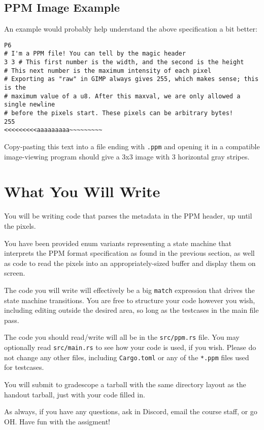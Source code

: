 \documentclass{article}
\begin{document}
\subsection*{PPM Image Example}
An example would probably help understand the above specification a bit better:
\begin{verbatim}
P6
# I'm a PPM file! You can tell by the magic header
3 3 # This first number is the width, and the second is the height
# This next number is the maximum intensity of each pixel
# Exporting as "raw" in GIMP always gives 255, which makes sense; this is the
# maximum value of a u8. After this maxval, we are only allowed a single newline
# before the pixels start. These pixels can be arbitrary bytes!
255
<<<<<<<<<aaaaaaaaa~~~~~~~~~
\end{verbatim}
Copy-pasting this text into a file ending with \texttt{.ppm} and opening it in a compatible image-viewing program should give a 3x3 image with 3 horizontal gray stripes.

\section*{What You Will Write}
You will be writing code that parses the metadata in the PPM header, up until the pixels.

You have been provided enum variants representing a state machine that interprets the PPM format specification as found in the previous section, as well as code to read the pixels into an appropriately-sized buffer and display them on screen.

The code you will write will effectively be a big \texttt{match} expression that drives the state machine transitions. You are free to structure your code however you wish, including editing outside the desired area, so long as the testcases in the main file pass.

The code you should read/write will all be in the \texttt{src/ppm.rs} file. You may optionally read \texttt{src/main.rs} to see how your code is used, if you wish. Please do not change any other files, including \texttt{Cargo.toml} or any of the \texttt{*.ppm} files used for testcases.

You will submit to gradescope a tarball with the same directory layout as the handout tarball, just with your code filled in.

As always, if you have any questions, ask in Discord, email the course staff, or go OH. Have fun with the assigment!
\end{document}
